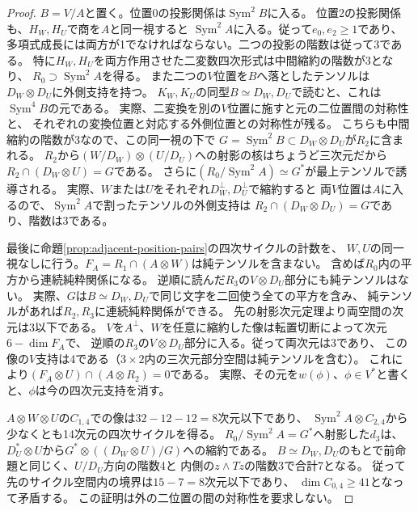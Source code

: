 \begin{proof}
$B=V/A$と置く。位置0の投影関係は$\operatorname{Sym}^2 B$に入る。
位置2の投影関係も、$H_W,H_U$で商を$A$と同一視すると
$\operatorname{Sym}^2 A$に入る。従って$e_0,e_2\ge1$であり、
多項式成長には両方が1でなければならない。二つの投影の階数は従って3である。
特に$H_W,H_U$を両方作用させた二変数四次形式は中間縮約の階数が3となり、
$R_0\supset\operatorname{Sym}^2A$を得る。
また二つの$V$位置を$B$へ落としたテンソルは$D_W\otimes D_U$に外側支持を持つ。
$K_W,K_U$の同型$B\simeq D_W,D_U$で読むと、これは$\operatorname{Sym}^4 B$の元である。
実際、二変換を別の$V$位置に施すと元の二位置間の対称性と、
それぞれの変換位置と対応する外側位置との対称性が残る。
こちらも中間縮約の階数が3なので、この同一視の下で
$G=\operatorname{Sym}^2 B\subset D_W\otimes D_U$が$R_2$に含まれる。
$R_2$から$(W/D_W)\otimes(U/D_U)$への射影の核はちょうど三次元だから
$R_2\cap (D_W\otimes U)=G$である。
さらに$(R_0/\operatorname{Sym}^2 A)\simeq G^*$が最上テンソルで誘導される。
実際、$W$または$U$をそれぞれ$D_W^\perp,D_U^\perp$で縮約すると
両$V$位置は$A$に入るので、$\operatorname{Sym}^2 A$で割ったテンソルの外側支持は
$R_2\cap(D_W\otimes D_U)=G$であり、階数は3である。

最後に命題\ref{prop:adjacent-position-pairs}の四次サイクルの計数を、
$W,U$の同一視なしに行う。$F_A=R_1\cap(A\otimes W)$は純テンソルを含まない。
含めば$R_0$内の平方から連続純粋関係になる。
逆順に読んだ$R_3$の$V\otimes D_U$部分にも純テンソルはない。
実際、$G$は$B\simeq D_W,D_U$で同じ文字を二回使う全ての平方を含み、
純テンソルがあれば$R_2,R_3$に連続純粋関係ができる。
先の射影次元定理より両空間の次元は3以下である。
$V$を$A^\perp$、$W$を任意に縮約した像は転置切断によって次元$6-\dim F_A$で、
逆順の$R_3$の$V\otimes D_U$部分に入る。従って両次元は3であり、
この像の$V$支持は4である（$3\times2$内の三次元部分空間は純テンソルを含む）。
これにより$(F_A\otimes U)\cap(A\otimes R_2)=0$である。
実際、その元を$w(\phi)$、$\phi\in V^*$と書くと、$\phi$は今の四次元支持を消す。

$A\otimes W\otimes U$の$C_{1,4}$での像は$32-12-12=8$次元以下であり、
$\operatorname{Sym}^2 A\otimes C_{2,4}$から少なくとも14次元の四次サイクルを得る。
$R_0/\operatorname{Sym}^2 A=G^*$へ射影した$d_3$は、
$D_U^*\otimes U$から$G^*\otimes((D_W\otimes U)/G)$への縮約である。
$B\simeq D_W,D_U$のもとで前命題と同じく、$U/D_U$方向の階数4と
内側の$z\wedge Tz$の階数3で合計7となる。
従って先のサイクル空間内の境界は$15-7=8$次元以下であり、
$\dim C_{0,4}\ge41$となって矛盾する。
この証明は外の二位置の間の対称性を要求しない。
\end{proof}

